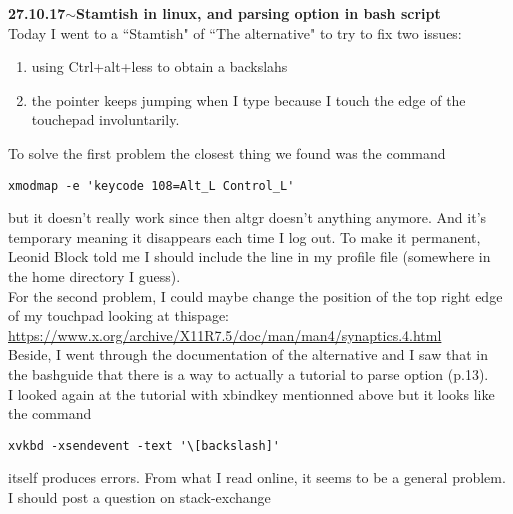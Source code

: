\documentclass[11pt,a4paper]{article}
\newenvironment{loggentry}[2]%
{\noindent\textbf{#1}\hspace{1cm}$\mathbf{\sim}$\text{ }\textbf{#2}\\}{\vspace{0.5cm}}
\begin{document}
\begin{loggentry}{27.10.17}{Stamtish in linux, and parsing option in bash script}
Today I went to a ``Stamtish" of ``The alternative" to try to fix two issues:\\
\begin{enumerate}
\item  using Ctrl+alt+less to obtain a backslahs
\item the pointer keeps jumping when I type because I touch the edge of the touchepad involuntarily.
\end{enumerate}
To solve the first problem the closest thing we found was the command
\begin{verbatim}
xmodmap -e 'keycode 108=Alt_L Control_L'
\end{verbatim}
but it doesn't really work since then altgr doesn't anything anymore. And it's temporary meaning it disappears each time I log out. To make it permanent, Leonid Block told me I should include the line in my profile file (somewhere in the home directory I guess).\\
For the second problem, I could maybe change the position of the top right edge of my touchpad looking at thispage:\\
\url{https://www.x.org/archive/X11R7.5/doc/man/man4/synaptics.4.html}\\
Beside, I went through the documentation of the alternative and I saw that in the bashguide that there is a way to actually a tutorial to parse option (p.13).\\
I looked again at the tutorial with xbindkey mentionned above but it looks like the command
\begin{verbatim}
xvkbd -xsendevent -text '\[backslash]'
\end{verbatim}
itself produces errors. From what I read online, it seems to be a general problem. I should post a question on stack-exchange
\end{loggentry}
\end{document}
